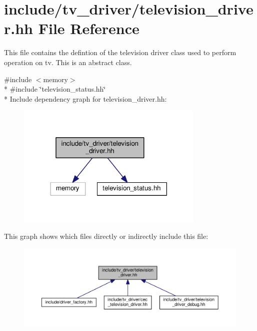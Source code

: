 \hypertarget{television__driver_8hh}{\section{include/tv\+\_\+driver/television\+\_\+driver.hh File Reference}
\label{television__driver_8hh}
}


This file contains the defintion of the television driver class used to perform operation on tv. This is an abstract class.  


{\ttfamily \#include $<$memory$>$}\\*
{\ttfamily \#include \char`\"{}television\+\_\+status.\+hh\char`\"{}}\\*
Include dependency graph for television\+\_\+driver.\+hh\+:
\nopagebreak
\begin{figure}[H]
\begin{center}
\leavevmode
\includegraphics[width=254pt]{television__driver_8hh__incl}
\end{center}
\end{figure}
This graph shows which files directly or indirectly include this file\+:
\nopagebreak
\begin{figure}[H]
\begin{center}
\leavevmode
\includegraphics[width=350pt]{television__driver_8hh__dep__incl}
\end{center}
\end{figure}
